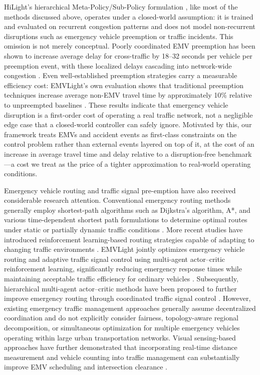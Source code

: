 \documentclass[3p,times]{elsarticle}
\theoremstyle{plain}
\theoremstyle{definition}
\begin{document}
HiLight's hierarchical Meta-Policy/Sub-Policy formulation
\cite{hilight}, like most of the methods discussed above, operates
under a closed-world assumption: it is trained and evaluated on
recurrent congestion patterns and does not model non-recurrent
disruptions such as emergency vehicle preemption or traffic
incidents. This omission is not merely conceptual. Poorly coordinated
EMV preemption has been shown to increase average delay for
cross-traffic by 18--32 seconds per vehicle per preemption event, with
these localized delays cascading into network-wide congestion
\cite{dtpreemption}. Even well-established preemption strategies carry
a measurable efficiency cost: EMVLight's own evaluation shows that
traditional preemption techniques increase average non-EMV travel
time by approximately 10\% relative to unpreempted baselines
\cite{emvlight}. These results indicate that emergency vehicle
disruption is a first-order cost of operating a real traffic network,
not a negligible edge case that a closed-world controller can safely
ignore. Motivated by this, our framework treats EMVs and accident
events as first-class constraints on the control problem rather than
external events layered on top of it, at the cost of an increase in
average travel time and delay relative to a disruption-free
benchmark---a cost we treat as the price of a tighter approximation to
real-world operating conditions.

Emergency vehicle routing and traffic signal pre-emption have also
received considerable research attention. Conventional emergency
routing methods generally employ shortest-path algorithms such as
Dijkstra's algorithm, A*, and various time-dependent shortest path
formulations to determine optimal routes under static or partially
dynamic traffic conditions
\cite{dijkstraemv,astar,tdsp,dynamicrouting,miprouting}. More recent
studies have introduced reinforcement learning-based routing
strategies capable of adapting to changing traffic environments
\cite{rlrouting}. EMVLight jointly optimizes emergency vehicle routing
and adaptive traffic signal control using multi-agent actor--critic
reinforcement learning, significantly reducing emergency response
times while maintaining acceptable traffic efficiency for ordinary
vehicles \cite{emvlight}. Subsequently, hierarchical multi-agent
actor--critic methods have been proposed to further improve emergency
routing through coordinated traffic signal control
\cite{hierarchicalemv}. However, existing emergency traffic management
approaches generally assume decentralized coordination and do not
explicitly consider fairness, topology-aware regional decomposition,
or simultaneous optimization for multiple emergency vehicles
operating within large urban transportation networks. Visual
sensing-based approaches have further demonstrated that incorporating
real-time distance measurement and vehicle counting into traffic
management can substantially improve EMV scheduling and intersection
clearance \cite{nellore2016}.
\end{document}
